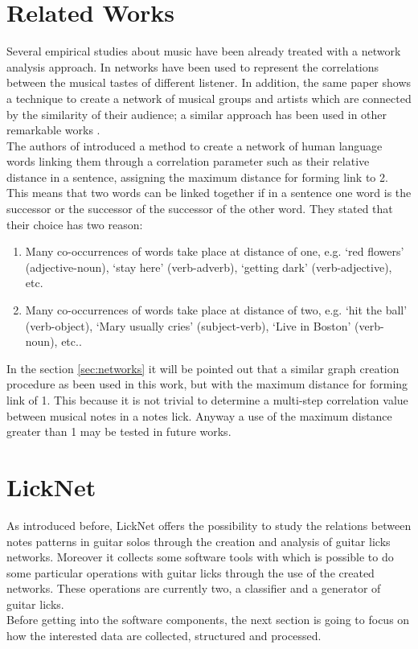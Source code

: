 \documentclass{llncs}
\begin{document}
\section{Related Works}
Several empirical studies about music have been already treated with a
network analysis approach. In \cite{music-genres} networks have been
used to represent the correlations between the musical tastes of
different listener. In addition, the same paper shows a technique to
create a network of musical groups and artists which are connected by
the similarity of their audience; a similar approach has been used in
other remarkable works \cite{artists-network}\cite{metal-network}.\\ 
The authors of \cite{sw-words} introduced a method to create a network of human language words linking
them through a correlation parameter such as their relative distance in
a sentence, assigning the maximum distance for forming link to 2. This
means that two words can be linked together if in a sentence one word is the
successor or the successor of the successor of the other word. They
stated that their choice has two reason:
\begin{enumerate}
\item Many co-occurrences of
words take place at distance of one, e.g. `red flowers' (adjective-noun), 
`stay here' (verb-adverb), `getting dark' (verb-adjective), etc. 
\item Many co-occurrences of words take place at distance of two, e.g.
`hit the ball' (verb-object),
`Mary usually cries' (subject-verb), `Live in Boston' (verb-noun), etc..
\end{enumerate}
In the section \ref{sec:networks} it will be pointed out  
that a similar graph creation procedure as been used in this work, but
with the maximum distance for forming link of 1. This because it is not
trivial
to determine a multi-step correlation value between musical notes in a
notes lick.
Anyway a use of the maximum distance greater than 1 may be tested in future works.

\section{LickNet}
As introduced before, LickNet offers the possibility to study the
relations between notes patterns in guitar solos through the creation
and analysis of guitar licks networks. Moreover it collects
some software tools with which is possible to do some particular
operations with guitar licks through the use of the created networks.
These operations are currently two, a classifier and a generator of
guitar licks.\\
Before getting into the software components, the next section is going
to focus on how the interested data are collected, structured and processed. 
\end{document}
